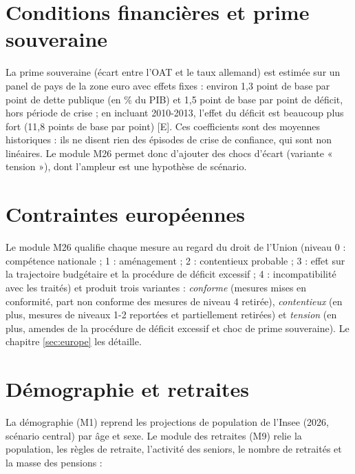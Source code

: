 \documentclass[
  11pt,
  11pt,
  a4paper,
  openany]{book}
\begin{document}
\hypertarget{sec:prime}{%
\section{Conditions financières et prime souveraine}\label{sec:prime}}

La prime souveraine (écart entre l'OAT et le taux allemand) est estimée
sur un panel de pays de la zone euro avec effets fixes : environ 1,3
point de base par point de dette publique (en \% du PIB) et 1,5 point de
base par point de déficit, hors période de crise ; en incluant
2010-2013, l'effet du déficit est beaucoup plus fort (11,8 points de
base par point) {[}E{]}. Ces coefficients sont des moyennes historiques
: ils ne disent rien des épisodes de crise de confiance, qui sont non
linéaires. Le module M26 permet donc d'ajouter des chocs d'écart
(variante « tension »), dont l'ampleur est une hypothèse de scénario.

\hypertarget{sec:contraintes-ue}{%
\section{Contraintes européennes}\label{sec:contraintes-ue}}

Le module M26 qualifie chaque mesure au regard du droit de l'Union
(niveau 0 : compétence nationale ; 1 : aménagement ; 2 : contentieux
probable ; 3 : effet sur la trajectoire budgétaire et la procédure de
déficit excessif ; 4 : incompatibilité avec les traités) et produit
trois variantes : \emph{conforme} (mesures mises en conformité, part non
conforme des mesures de niveau 4 retirée), \emph{contentieux} (en plus,
mesures de niveaux 1-2 reportées et partiellement retirées) et
\emph{tension} (en plus, amendes de la procédure de déficit excessif et
choc de prime souveraine). Le chapitre \ref{sec:europe} les détaille.

\hypertarget{sec:demo-retraites}{%
\section{Démographie et retraites}\label{sec:demo-retraites}}

La démographie (M1) reprend les projections de population de l'Insee
(2026, scénario central) par âge et sexe. Le module des retraites (M9)
relie la population, les règles de retraite, l'activité des seniors, le
nombre de retraités et la masse des pensions :
\end{document}
